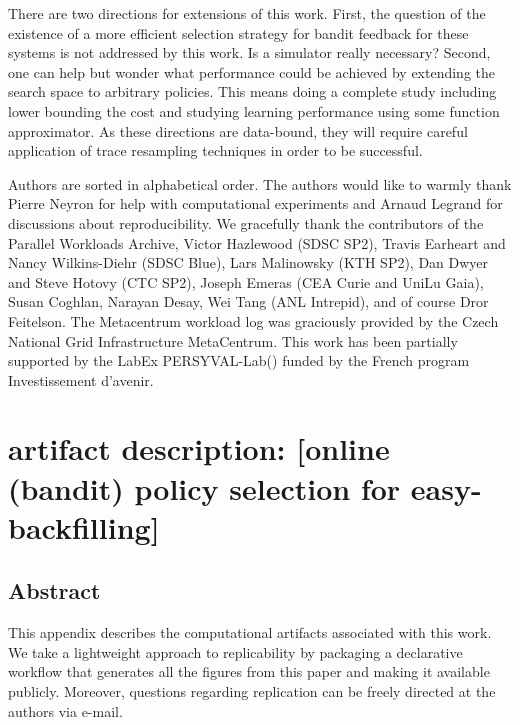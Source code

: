 \documentclass[sigconf,review]{acmart}
\begin{document}
There are two directions for extensions of this work.  First, the question of
the existence of a more efficient selection strategy for bandit feedback for
these systems is not addressed by this work. Is a simulator really necessary?
Second, one can help but wonder what performance could be achieved by extending
the search space to arbitrary policies. This means doing a complete study
including lower bounding the cost and studying learning performance using some
function approximator.
As these directions are data-bound, they will require careful application of
trace resampling techniques in order to be successful.

\begin{acks}

Authors are sorted in alphabetical order. The authors would like to warmly
thank Pierre Neyron for help with computational experiments and Arnaud Legrand
for discussions about reproducibility. We gracefully thank the contributors of
the Parallel Workloads Archive, Victor Hazlewood (SDSC SP2), Travis Earheart
and Nancy Wilkins-Diehr (SDSC Blue), Lars Malinowsky (KTH SP2), Dan Dwyer and
Steve Hotovy (CTC SP2), Joseph Emeras (CEA Curie and UniLu Gaia), Susan
Coghlan, Narayan Desay, Wei Tang (ANL Intrepid), and of course Dror Feitelson.
The Metacentrum workload log was graciously provided by the Czech National Grid
Infrastructure MetaCentrum. This work has been partially supported by the LabEx
PERSYVAL-Lab() funded by
the French program Investissement d'avenir.
\end{acks}




\clearpage

\section{artifact description: [online (bandit) policy selection for easy-backfilling]}

\subsection{Abstract}

This appendix describes the computational artifacts associated with this work. We
take a lightweight approach to replicability by packaging a declarative
workflow that generates all the figures from this paper and making it available
publicly. Moreover, questions regarding replication can be freely directed at
the authors via e-mail.
\end{document}
